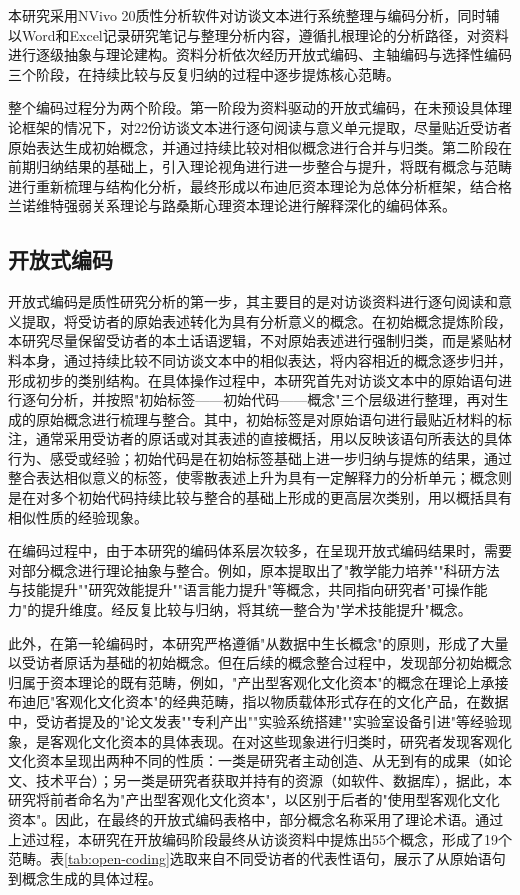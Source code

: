 本研究采用NVivo 20质性分析软件对访谈文本进行系统整理与编码分析，同时辅以Word和Excel记录研究笔记与整理分析内容，遵循扎根理论的分析路径，对资料进行逐级抽象与理论建构。资料分析依次经历开放式编码、主轴编码与选择性编码三个阶段，在持续比较与反复归纳的过程中逐步提炼核心范畴。

整个编码过程分为两个阶段。第一阶段为资料驱动的开放式编码，在未预设具体理论框架的情况下，对22份访谈文本进行逐句阅读与意义单元提取，尽量贴近受访者原始表达生成初始概念，并通过持续比较对相似概念进行合并与归类。第二阶段在前期归纳结果的基础上，引入理论视角进行进一步整合与提升，将既有概念与范畴进行重新梳理与结构化分析，最终形成以布迪厄资本理论为总体分析框架，结合格兰诺维特强弱关系理论与路桑斯心理资本理论进行解释深化的编码体系。

\subsection{开放式编码}

开放式编码是质性研究分析的第一步，其主要目的是对访谈资料进行逐句阅读和意义提取，将受访者的原始表述转化为具有分析意义的概念。在初始概念提炼阶段，本研究尽量保留受访者的本土话语逻辑，不对原始表述进行强制归类，而是紧贴材料本身，通过持续比较不同访谈文本中的相似表达，将内容相近的概念逐步归并，形成初步的类别结构。在具体操作过程中，本研究首先对访谈文本中的原始语句进行逐句分析，并按照"初始标签——初始代码——概念"三个层级进行整理，再对生成的原始概念进行梳理与整合。其中，初始标签是对原始语句进行最贴近材料的标注，通常采用受访者的原话或对其表述的直接概括，用以反映该语句所表达的具体行为、感受或经验；初始代码是在初始标签基础上进一步归纳与提炼的结果，通过整合表达相似意义的标签，使零散表述上升为具有一定解释力的分析单元；概念则是在对多个初始代码持续比较与整合的基础上形成的更高层次类别，用以概括具有相似性质的经验现象。

在编码过程中，由于本研究的编码体系层次较多，在呈现开放式编码结果时，需要对部分概念进行理论抽象与整合。例如，原本提取出了"教学能力培养""科研方法与技能提升""研究效能提升""语言能力提升"等概念，共同指向研究者"可操作能力"的提升维度。经反复比较与归纳，将其统一整合为"学术技能提升"概念。

此外，在第一轮编码时，本研究严格遵循"从数据中生长概念"的原则，形成了大量以受访者原话为基础的初始概念。但在后续的概念整合过程中，发现部分初始概念归属于资本理论的既有范畴，例如，"产出型客观化文化资本"的概念在理论上承接布迪厄"客观化文化资本"的经典范畴，指以物质载体形式存在的文化产品，在数据中，受访者提及的"论文发表""专利产出""实验系统搭建""实验室设备引进"等经验现象，是客观化文化资本的具体表现。在对这些现象进行归类时，研究者发现客观化文化资本呈现出两种不同的性质：一类是研究者主动创造、从无到有的成果（如论文、技术平台）；另一类是研究者获取并持有的资源（如软件、数据库），据此，本研究将前者命名为"产出型客观化文化资本"，以区别于后者的"使用型客观化文化资本"。因此，在最终的开放式编码表格中，部分概念名称采用了理论术语。通过上述过程，本研究在开放编码阶段最终从访谈资料中提炼出55个概念，形成了19个范畴。表\ref{tab:open-coding}选取来自不同受访者的代表性语句，展示了从原始语句到概念生成的具体过程。

